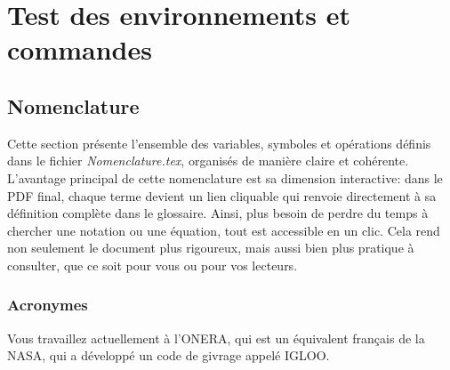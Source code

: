 

\graphicspath{{5_Images/A_Demonstration/}}                      %
\makeatletter
{}                    %
\makeatother

\chapter{Test des environnements et commandes}\label{Annexe:Test}    %


\section{Nomenclature}\label{Annexe_A:Nomenclature}

Cette section présente l’ensemble des variables, symboles et opérations définis dans le fichier \emph{Nomenclature.tex}, organisés de manière claire et cohérente. L’avantage principal de cette nomenclature est sa dimension interactive: dans le PDF final, chaque terme devient un lien cliquable qui renvoie directement à sa définition complète dans le glossaire. Ainsi, plus besoin de perdre du temps à chercher une notation ou une équation, tout est accessible en un clic. Cela rend non seulement le document plus rigoureux, mais aussi bien plus pratique à consulter, que ce soit pour vous ou pour vos lecteurs.

\subsection{Acronymes}\label{Annexe_A:Acronymes}

Vous travaillez actuellement à l'\gls{ONERA}, qui est un équivalent français de la \gls{NASA}, qui a développé un code de givrage appelé \gls{IGLOO}.

